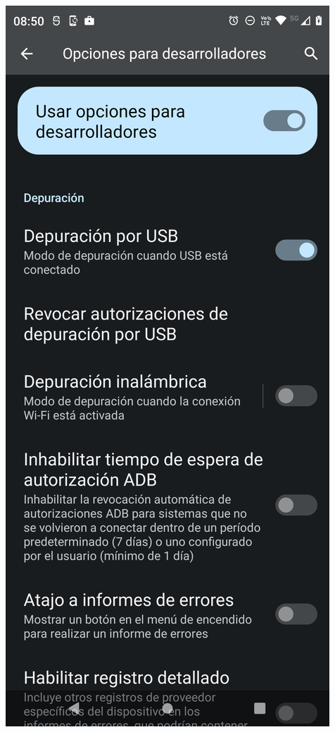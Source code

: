 \begin{frame}
\begin{columns}
\begin{center}
\end{center}
\begin{center}
\includegraphics[width=0.95\linewidth]{00_Configurar/ModoDesarrollador8.png}    
\end{center}
\end{columns}
\end{frame}

